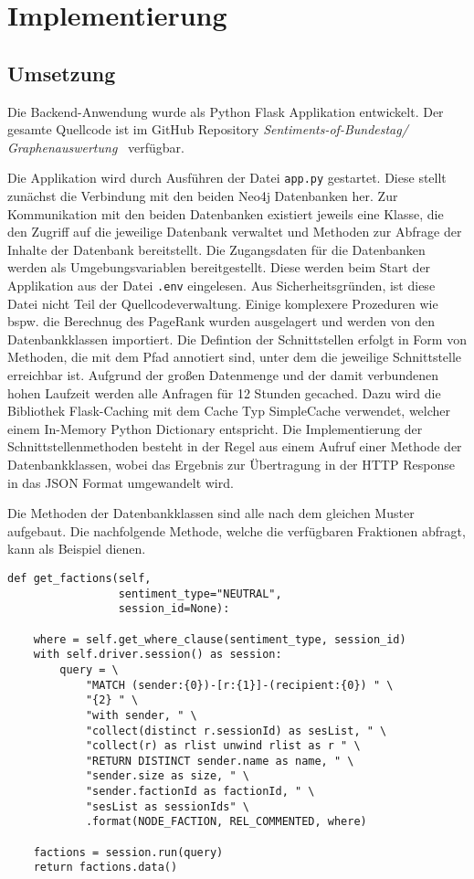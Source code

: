 \section{Implementierung}

\subsection{Umsetzung}
Die Backend-Anwendung wurde als Python Flask Applikation entwickelt. Der gesamte Quellcode ist im GitHub Repository \textit{Sentiments-of-Bundestag/ Graphenauswertung}~\cite{github_graphenauswertung} verfügbar.

Die Applikation wird durch Ausführen der Datei \lstinline{app.py} gestartet.
Diese stellt zunächst die Verbindung mit den beiden Neo4j Datenbanken her.
Zur Kommunikation mit den beiden Datenbanken existiert jeweils eine Klasse, die den Zugriff auf die jeweilige Datenbank verwaltet und Methoden zur Abfrage der Inhalte der Datenbank bereitstellt.
Die Zugangsdaten für die Datenbanken werden als Umgebungsvariablen bereitgestellt. Diese werden beim Start der Applikation aus der Datei \lstinline{.env} eingelesen.
Aus Sicherheitsgründen, ist diese Datei nicht Teil der Quellcodeverwaltung.
Einige komplexere Prozeduren wie bspw. die Berechnug des PageRank wurden ausgelagert und werden von den Datenbankklassen importiert.
Die Defintion der Schnittstellen erfolgt in Form von Methoden, die mit dem Pfad annotiert sind, unter dem die jeweilige Schnittstelle erreichbar ist.
Aufgrund der großen Datenmenge und der damit verbundenen hohen Laufzeit werden alle Anfragen für 12 Stunden gecached.
Dazu wird die Bibliothek Flask-Caching mit dem Cache Typ SimpleCache verwendet, welcher einem In-Memory Python Dictionary entspricht.\cite{flask_caching}
Die Implementierung der Schnittstellenmethoden besteht in der Regel aus einem Aufruf einer Methode der Datenbankklassen, wobei das Ergebnis zur Übertragung in der HTTP Response in das JSON Format umgewandelt wird.

Die Methoden der Datenbankklassen sind alle nach dem gleichen Muster aufgebaut.
Die nachfolgende Methode, welche die verfügbaren Fraktionen abfragt, kann als Beispiel dienen.

\begin{lstlisting}[caption={Zugriff auf Neo4j DB: get\_factions}, captionpos=b]
def get_factions(self,
                 sentiment_type="NEUTRAL",
                 session_id=None):

    where = self.get_where_clause(sentiment_type, session_id)
    with self.driver.session() as session:
        query = \
            "MATCH (sender:{0})-[r:{1}]-(recipient:{0}) " \
            "{2} " \
            "with sender, " \
            "collect(distinct r.sessionId) as sesList, " \
            "collect(r) as rlist unwind rlist as r " \
            "RETURN DISTINCT sender.name as name, " \
            "sender.size as size, " \
            "sender.factionId as factionId, " \
            "sesList as sessionIds" \
            .format(NODE_FACTION, REL_COMMENTED, where)

    factions = session.run(query)
    return factions.data()
\end{lstlisting}

